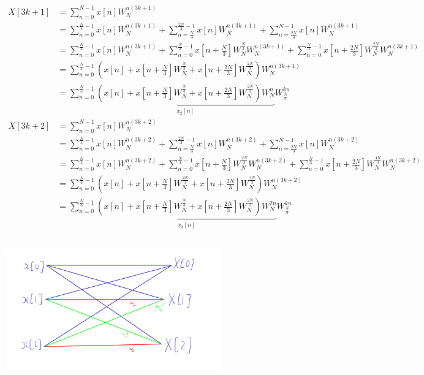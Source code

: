 \documentclass{article}
\begin{document}
\begin{align}
    X[3k + 1] &= \sum_{n = 0}^{N - 1} x[n] W_N^{n(3k + 1)} \\
    &= \sum_{n = 0}^{\frac{N}{3} - 1} x[n] W_N^{n(3k + 1)} + \sum_{n = \frac{N}{3}}^{\frac{2N}{3} - 1} x[n] W_N^{n(3k + 1)} + \sum_{n = \frac{2N}{3}}^{N - 1} x[n] W_N^{n(3k + 1)} \\
    &= \sum_{n = 0}^{\frac{N}{3} - 1} x[n] W_N^{n(3k + 1)} + \sum_{n = 0}^{\frac{N}{3} - 1} x\left[n + \frac{N}{3}\right] W_N^{\frac{N}{3}} W_N^{n(3k + 1)} + \sum_{n = 0}^{\frac{N}{3} - 1} x\left[n + \frac{2N}{3}\right] W_N^{\frac{2N}{3}} W_N^{n(3k + 1)} \\
    &= \sum_{n = 0}^{\frac{N}{3} - 1} \left(x[n] + x\left[n + \frac{N}{3}\right] W_N^{\frac{N}{3}} + x\left[n + \frac{2N}{3}\right] W_N^{\frac{2N}{3}}\right) W_N^{n(3k + 1)} \\
    &= \sum_{n = 0}^{\frac{N}{3} - 1} \underbrace{\left(x[n] + x\left[n + \frac{N}{3}\right] W_N^{\frac{N}{3}} + x\left[n + \frac{2N}{3}\right] W_N^{\frac{2N}{3}}\right) W_N^n}_{x_2[n]} W_{\frac{N}{3}}^{kn} \\
    X[3k + 2] &= \sum_{n = 0}^{N - 1} x[n] W_N^{n(3k + 2)} \\
    &= \sum_{n = 0}^{\frac{N}{3} - 1} x[n] W_N^{n(3k + 2)} + \sum_{n = \frac{N}{3}}^{\frac{2N}{3} - 1} x[n] W_N^{n(3k + 2)} + \sum_{n = \frac{2N}{3}}^{N - 1} x[n] W_N^{n(3k + 2)} \\
    &= \sum_{n = 0}^{\frac{N}{3} - 1} x[n] W_N^{n(3k + 2)} + \sum_{n = 0}^{\frac{N}{3} - 1} x\left[n + \frac{N}{3}\right] W_N^{\frac{2N}{3}} W_N^{n(3k + 2)} + \sum_{n = 0}^{\frac{N}{3} - 1} x\left[n + \frac{2N}{3}\right] W_N^{\frac{4N}{3}} W_N^{n(3k + 2)} \\
    &= \sum_{n = 0}^{\frac{N}{3} - 1} \left(x[n] + x\left[n + \frac{N}{3}\right] W_N^{\frac{2N}{3}} + x\left[n + \frac{2N}{3}\right] W_N^{\frac{4N}{3}}\right) W_N^{n(3k + 2)} \\
    &= \sum_{n = 0}^{\frac{N}{3} - 1} \underbrace{\left(x[n] + x\left[n + \frac{N}{3}\right] W_N^{\frac{N}{3}} + x\left[n + \frac{2N}{3}\right] W_N^{\frac{2N}{3}}\right) W_N^{2n}}_{x_3[n]} W_{\frac{N}{3}}^{kn}
\end{align}

\subsection{}

\begin{center}
    \includegraphics[width=0.7\textwidth]{q6c.png}
\end{center}
\end{document}
